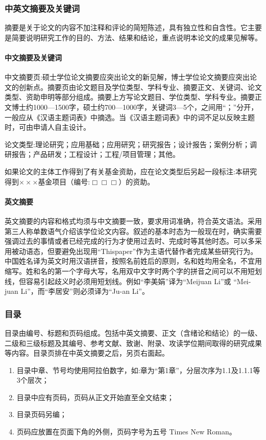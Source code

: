 \subsubsection{中英文摘要及关键词}
摘要是关于论文的内容不加注释和评论的简短陈述，具有独立性和自含性。它主要是简要说明研究工作的目的、方法、结果和结论，重点说明本论文的成果见解等。
\paragraph{中文摘要及关键词}
中文摘要页:硕士学位论文摘要应突出论文的新见解，博士学位论文摘要应突出论文的创新点。摘要页由论文题目及学位类型、学科专业、摘要正文、关键词、论文类型、资助申明等部分组成。摘要上方写论文题目、学位类型、学科专业。摘要正文博士约1000—1500字，硕士约700—1000字，关键词3—5个，之间用“；”分开，一般应从《汉语主题词表》中摘选。当《汉语主题词表》中的词不足以反映主题时，可由申请人自主设计。

论文类型:理论研究；应用基础；应用研究；研究报告；设计报告；案例分析；调研报告；产品研发；工程设计；工程/项目管理；其他。

如果论文的主体工作得到了有关基金资助，应在论文类型后另起一段标注:本研究得到$\times\times\times$基金项目（编号:$\Box\Box\Box$）的资助。

\paragraph{英文摘要}
英文摘要的内容和格式均须与中文摘要一致，要求用词准确，符合英文语法。采用第三人称单数语气介绍该学位论文内容。叙述的基本时态为一般现在时，确实需要强调过去的事情或者已经完成的行为才使用过去时、完成时等其他时态。可以多采用被动语态，但要避免出现用“Thispaper”作为主语代替作者完成某些研究行为。中国姓名译为英文时用汉语拼音，按照名前姓后的原则，名和姓均用全名，不宜用缩写。姓和名的第一个字母大写，名用双中文字时两个字的拼音之间可以不用短划线，但容易引起歧义时必须用短划线。例如“李美娟”译为“Meijuan Li”或 “Mei-juan Li”，而“李居安”则必须译为“Ju-an Li”。

\subsubsection{目录}
目录由编号、标题和页码组成。包括中英文摘要、正文（含绪论和结论）的一级、二级和三级标题及其编号、参考文献、致谢、附录、攻读学位期间取得的研究成果等内容。目录页排在中英文摘要之后，另页右面起。
\begin{enumerate}[1)]
    \item 目录中章、节号均使用阿拉伯数字，如:章为“第1章”，分层次序为1.1及1.1.1等3个层次；
    \item 目录中应有页码，页码从正文开始直至全文结束；
    \item 目录页码另编；
    \item 页码应放置在页面下角的外侧，页码字号为五号 Times New Roman。
\end{enumerate}


